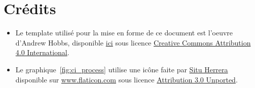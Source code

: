 \pagebreak
\section{Crédits}
\begin{itemize}
\item Le template utilisé pour la mise en forme de ce document est l'oeuvre d'Andrew Hobbs, disponible \href{https://www.overleaf.com/latex/templates/climate-policy-initiative-report-template/kjfjzrcjgtqg#.WTVoYKJVtv0}{ici} sous licence \href{https://creativecommons.org/licenses/by/4.0/}{Creative Commons Attribution 4.0 International}.  
\item Le graphique~\ref{fig:ci_process} utilise une icône faite par \href{https://www.flaticon.com/authors/situ-herrera}{Situ Herrera} disponible sur \href{https://www.flaticon.com}{www.flaticon.com} sous licence \href{https://creativecommons.org/licenses/by/3.0/}{Attribution 3.0 Unported}.
\end{itemize}